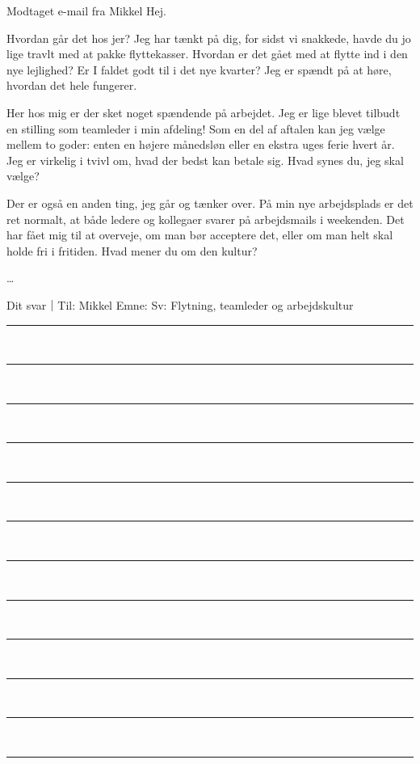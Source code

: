 \begin{emailbox}{Modtaget e-mail fra Mikkel}
Hej.

\vspace{0.3em}
Hvordan går det hos jer? Jeg har tænkt på dig, for sidst vi snakkede, havde du jo lige travlt med at pakke flyttekasser. Hvordan er det gået med at flytte ind i den nye lejlighed? Er I faldet godt til i det nye kvarter? Jeg er spændt på at høre, hvordan det hele fungerer.

\vspace{0.3em}
Her hos mig er der sket noget spændende på arbejdet. Jeg er lige blevet tilbudt en stilling som teamleder i min afdeling! Som en del af aftalen kan jeg vælge mellem to goder: enten en højere månedsløn eller en ekstra uges ferie hvert år. Jeg er virkelig i tvivl om, hvad der bedst kan betale sig. Hvad synes du, jeg skal vælge?

\vspace{0.3em}
Der er også en anden ting, jeg går og tænker over. På min nye arbejdsplads er det ret normalt, at både ledere og kollegaer svarer på arbejdsmails i weekenden. Det har fået mig til at overveje, om man bør acceptere det, eller om man helt skal holde fri i fritiden. Hvad mener du om den kultur?

\vspace{0.3em}
\ldots
\end{emailbox}

\begin{emailbox}{Dit svar｜Til: Mikkel \qquad Emne: Sv: Flytning, teamleder og arbejdskultur}
\vspace{0.3em}
\rule{\linewidth}{0.4pt}\\[0.55em]
\rule{\linewidth}{0.4pt}\\[0.55em]
\rule{\linewidth}{0.4pt}\\[0.55em]
\rule{\linewidth}{0.4pt}\\[0.55em]
\rule{\linewidth}{0.4pt}\\[0.55em]
\rule{\linewidth}{0.4pt}\\[0.55em]
\rule{\linewidth}{0.4pt}\\[0.55em]
\rule{\linewidth}{0.4pt}\\[0.55em]
\rule{\linewidth}{0.4pt}\\[0.55em]
\rule{\linewidth}{0.4pt}\\[0.55em]
\rule{\linewidth}{0.4pt}\\[0.55em]
\rule{\linewidth}{0.4pt}
\end{emailbox}

